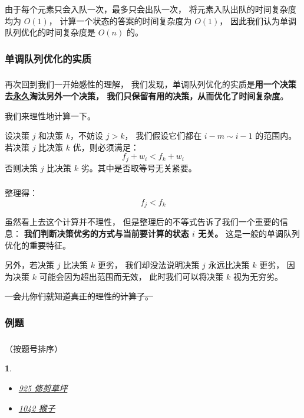 \documentclass[9pt, UTF8]{beamer} %
\newcommand \ftss {\frametitle{\insertsubsubsection}}
\newcommand \bpause { \bigskip \pause }
\newtheorem*{bbox}{}
\begin{document}
	\begin{frame}
		\ftss

		由于每个元素只会入队一次，最多只会出队一次，
		将元素入队出队的时间复杂度均为 $O(1)$，
		计算一个状态的答案的时间复杂度为 $O(1)$，
		因此我们认为单调队列优化的时间复杂度是 $O(n)$ 的。
	\end{frame}

	\subsubsection{单调队列优化的实质}

	\begin{frame}
		\ftss

		再次回到我们一开始感性的理解，
		我们发现，单调队列优化的实质是\textbf{用一个决策
		去\uline{永久}淘汰另外一个决策，
		我们只保留有用的决策，从而优化了时间复杂度}。

		\bpause

		我们来理性地计算一下。

		\pause

		设决策 $j$ 和决策 $k$，不妨设 $j > k$，
		我们假设它们都在 $i - m \sim i - 1$ 的范围内。
		若决策 $j$ 比决策 $k$ 优，则必须满足：
		$$
		f_j + w_i < f_k + w_i
		$$
		否则决策 $j$ 比决策 $k$ 劣。其中是否取等号无关紧要。
	\end{frame}

	\begin{frame}
		\ftss

		整理得：
		$$
		f_j < f_k
		$$

		虽然看上去这个计算并不理性，
		但是整理后的不等式告诉了我们一个重要的信息：
		\textbf{我们判断决策优劣的方式与当前要计算的状态 $i$ 无关。}
		这是一般的单调队列优化的重要特征。

		\bpause

		另外，若决策 $j$ 比决策 $k$ 更劣，
		我们却没法说明决策 $j$ 永远比决策 $k$ 更劣，
		因为决策 $k$ 可能会因为超出范围而无效，
		此时我们可以将决策 $k$ 视为无穷劣。

		\bpause

		\sout{一会儿你们就知道真正的理性的计算了。}
	\end{frame}

	\subsubsection{例题}

	\begin{frame}
		\ftss

		（按题号排序）

		\begin{bbox}
			\begin{itemize}
				\item
				\href {http://219.153.61.2:9000/problem/925} {925 修剪草坪}

				\item
				\href {http://219.153.61.2:9000/problem/1042} {1042 猴子}
			\end{itemize}
		\end{bbox}
	\end{frame}
\end{document}
